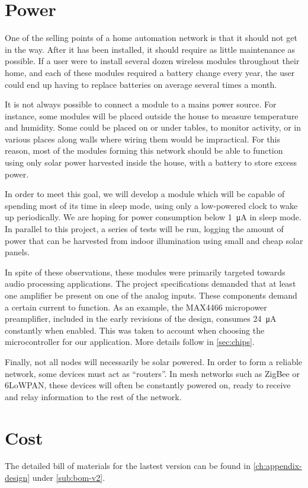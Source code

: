 \section{Power}\label{sec:power}

One of the selling points of a home automation network is that it should not get
in the way. After it has been installed, it should require as little maintenance
as possible. If a user were to install several dozen wireless modules throughout
their home, and each of these modules required a battery change every year, the
user could end up having to replace batteries on average several times a month. 

It is not always possible to connect a module to a mains power source. For
instance, some modules will be placed outside the house to measure temperature
and humidity. Some could be placed on or under tables, to monitor activity, or
in various places along walls where wiring them would be impractical. For this
reason, most of the modules forming this network should be able to function
using only solar power harvested inside the house, with a battery to store
excess power.

In order to meet this goal, we will develop a module which will be capable of
spending most of its time in sleep mode, using only a low-powered clock to wake
up periodically. We are hoping for power consumption below
\SI{1}{\micro\ampere} in sleep mode. In parallel to this project, a series of
tests will be run, logging the amount of power that can be harvested from indoor
illumination using small and cheap solar panels.

In spite of these observations, these modules were primarily targeted towards
audio processing applications. The project specifications demanded that at least
one amplifier be present on one of the analog inputs. These components demand
a certain current to function. As an example, the MAX4466 micropower
preamplifier, included in the early revisions of the design, consumes
\SI{24}{\micro\ampere} constantly when enabled. This was taken to account when
choosing the microcontroller for our application. More details follow in
\autoref{sec:chips}.

Finally, not all nodes will necessarily be solar powered. In order to form
a reliable network, some devices must act as ``routers''. In mesh networks such
as ZigBee or \ac{6LoWPAN}, these devices will often be constantly powered on,
ready to receive and relay information to the rest of the network.


\section{Cost}\label{sec:cost}

The detailed bill of materials for the lastest version can be found in
\autoref{ch:appendix-design} under \autoref{sub:bom-v2}.

